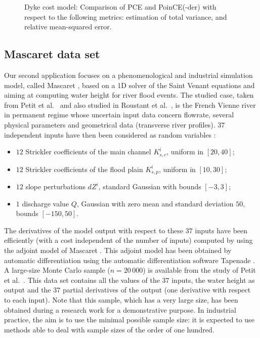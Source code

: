 \documentclass[a4paper,11pt]{article}
\renewcommand{\citep}[2][]{\cite[#1]{#2}}
\renewcommand{\citet}[2][]{\cite[#1]{#2}}
\theoremstyle{definition}
\theoremstyle{remark}
\theoremstyle{theorem}
\begin{document}
\begin{figure}[htbp]
	\centering
	\hspace{1cm}
	\caption{Dyke cost model: Comparison of PCE and PoinCE(-der) with respect to the following metrics: estimation of total variance, and relative mean-squared error.}
\end{figure}



\subsection{Mascaret data set}

Our second application focuses on a phenomenological and industrial simulation model, called Mascaret \citep{Goutal_et_al_2012}, based on a 1D solver of the Saint Venant equations and aiming at computing water height for river flood events.
The studied case, taken from Petit et al.~\citet{Petit2016} and also studied in Roustant et al.~\citet{roubar17}, is the French Vienne river in permanent regime whose uncertain input data concern flowrate, several physical parameters and geometrical data (transverse river profiles).
$37$ independent inputs have then been considered as random variables \citep{Petit2016}:
\begin{itemize}
	\item $12$ Strickler coefficients of the main channel $K_{s,c}^i$, uniform in $[20, 40]$;
	\item $12$ Strickler coefficients of the flood plain $K_{s,p}^i$, uniform in $[10, 30]$;
	\item $12$ slope perturbations $dZ^i$, standard Gaussian with bounds $[-3,3]$;
	\item $1$ discharge value $Q$, Gaussian with zero mean and standard deviation $50$, bounds $[-150,50]$.
\end{itemize}
The derivatives of the model output with respect to these $37$ inputs have been efficiently (with a cost independent of the number of inputs) computed by using the adjoint model of Mascaret \citep{demgoe16}.
This adjoint model has been obtained by automatic differentiation \citep{griwal08} using the automatic differentiation software Tapenade \citep{haspal13}.
A large-size Monte Carlo sample ($n=20\,000$) is available from the study of Petit et al.~\citet{Petit2016}.
This data set contains all the values of the $37$ inputs, the water height as output and the $37$ partial derivatives of the output (one derivative with respect to each input).
Note that this sample, which has a very large size, has been obtained during a research work for a demonstrative purpose.
In industrial practice, the aim is to use the minimal possible sample size: it is expected to use methods able to deal with sample sizes of the order of one hundred. 
\end{document}
